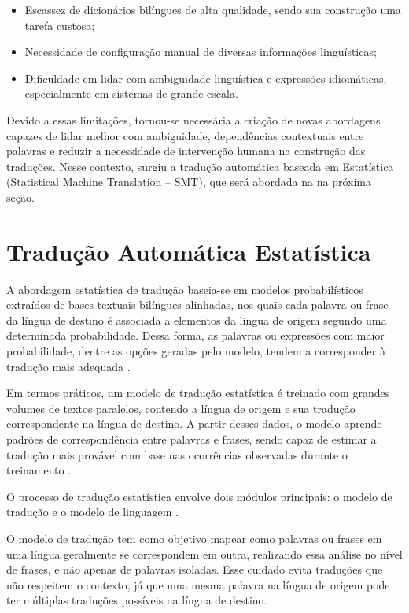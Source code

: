 \begin{itemize}
    \item Escassez de dicionários bilíngues de alta qualidade, sendo sua construção uma tarefa custosa;
    \item Necessidade de configuração manual de diversas informações linguísticas;
    \item Dificuldade em lidar com ambiguidade linguística e expressões idiomáticas, especialmente em sistemas de grande escala.
\end{itemize}

Devido a essas limitações, tornou-se necessária a criação de novas abordagens capazes de lidar melhor com ambiguidade, dependências contextuais entre palavras e reduzir a necessidade de intervenção humana na construção das traduções. Nesse contexto, surgiu a tradução automática baseada em Estatística (Statistical Machine Translation – SMT), que será abordada na na próxima seção.


\section{Tradução Automática Estatística}
A abordagem estatística de tradução baseia-se em modelos probabilísticos extraídos de bases textuais bilíngues alinhadas, nos quais cada palavra ou frase da língua de destino é associada a elementos da língua de origem segundo uma determinada probabilidade. Dessa forma, as palavras ou expressões com maior probabilidade, dentre as opções geradas pelo modelo, tendem a corresponder à tradução mais adequada \cite{DBLP:journals/corr/abs-1708-04559}.

Em termos práticos, um modelo de tradução estatística é treinado com grandes volumes de textos paralelos, contendo a língua de origem e sua tradução correspondente na língua de destino. A partir desses dados, o modelo aprende padrões de correspondência entre palavras e frases, sendo capaz de estimar a tradução mais provável com base nas ocorrências observadas durante o treinamento \cite{lokalise_smt_2025}.

O processo de tradução estatística envolve dois módulos principais: o modelo de tradução e o modelo de linguagem \cite{wang2017neural}.

O modelo de tradução tem como objetivo mapear como palavras ou frases em uma língua geralmente se correspondem em outra, realizando essa análise no nível de frases, e não apenas de palavras isoladas. Esse cuidado evita traduções que não respeitem o contexto, já que uma mesma palavra na língua de origem pode ter múltiplas traduções possíveis na língua de destino.

